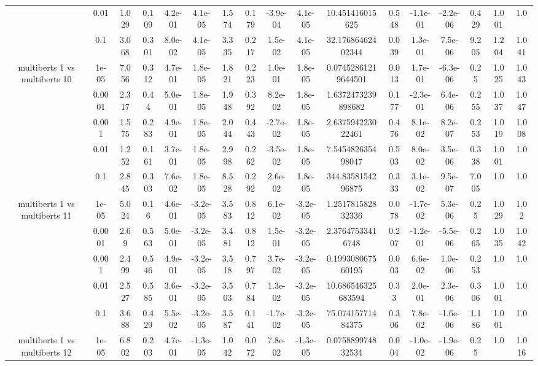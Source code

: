 \begin{tabular}{|c|c|c|c|c|c|c|c|c|c|c|c|c|c|c|c|c|}
 & 0.01 & 1.029 & 0.109 & 4.2e-01 & 4.1e-05 & 1.574 & 0.179 & -3.9e-04 & 4.1e-05 & 10.451416015625 & 0.548 & -1.1e-01 & -2.2e-06 & 0.429 & 1.001 & 1.0 \\
 & 0.1 & 3.068 & 0.301 & 8.0e-02 & 4.1e-05 & 3.335 & 0.217 & 1.5e-02 & 4.1e-05 & 32.17686462402344 & 0.039 & 1.3e-01 & 7.5e-06 & 9.205 & 1.204 & 1.041 \\
\hline
\multirow{5}{*}{multiberts 1 vs multiberts 10} & 1e-05 & 7.056 & 0.312 & 4.7e-01 & 1.8e-05 & 1.821 & 0.223 & 1.0e-01 & 1.8e-05 & 0.07452861219644501 & 0.013 & 1.7e-01 & -6.3e-06 & 0.25 & 1.025 & 1.043 \\
 & 0.0001 & 2.317 & 0.44 & 5.0e-01 & 1.8e-05 & 1.948 & 0.392 & 8.2e-02 & 1.8e-05 & 1.6372473239898682 & 0.177 & -2.3e-01 & 6.4e-06 & 0.255 & 1.037 & 1.047 \\
 & 0.001 & 1.575 & 0.283 & 4.9e-01 & 1.8e-05 & 2.044 & 0.443 & -2.7e-02 & 1.8e-05 & 2.637594223022461 & 0.476 & 8.1e-02 & 8.2e-07 & 0.253 & 1.019 & 1.008 \\
 & 0.01 & 1.252 & 0.161 & 3.7e-01 & 1.8e-05 & 2.998 & 0.262 & -3.5e-02 & 1.8e-05 & 7.545482635498047 & 0.503 & 8.0e-02 & 3.5e-06 & 0.338 & 1.001 & 1.0 \\
 & 0.1 & 2.845 & 0.303 & 7.6e-02 & 1.8e-05 & 8.528 & 0.292 & 2.6e-02 & 1.8e-05 & 344.8358154296875 & 0.333 & 3.1e-02 & 9.5e-07 & 7.005 & 1.0 & 1.0 \\
\hline
\multirow{5}{*}{multiberts 1 vs multiberts 11} & 1e-05 & 5.024 & 0.16 & 4.6e-01 & -3.2e-05 & 3.583 & 0.812 & 6.1e-02 & -3.2e-05 & 1.251781582832336 & 0.078 & -1.7e-02 & 5.3e-06 & 0.25 & 1.029 & 1.02 \\
 & 0.0001 & 2.69 & 0.563 & 5.0e-01 & -3.2e-05 & 3.481 & 0.812 & 1.5e-01 & -3.2e-05 & 2.37647533416748 & 0.207 & -1.2e-01 & -5.5e-06 & 0.265 & 1.035 & 1.042 \\
 & 0.001 & 2.499 & 0.546 & 4.9e-01 & -3.2e-05 & 3.518 & 0.797 & 3.7e-02 & -3.2e-05 & 0.199308067560195 & 0.003 & 6.6e-02 & 1.0e-06 & 0.253 & 1.0 & 1.0 \\
 & 0.01 & 2.527 & 0.585 & 3.6e-01 & -3.2e-05 & 3.503 & 0.784 & 1.3e-02 & -3.2e-05 & 10.686546325683594 & 0.33 & 2.0e-01 & 2.3e-06 & 0.306 & 1.001 & 1.0 \\
 & 0.1 & 3.688 & 0.429 & 5.5e-02 & -3.2e-05 & 3.587 & 0.141 & -1.7e-02 & -3.2e-05 & 75.07415771484375 & 0.306 & 7.8e-02 & -1.6e-06 & 1.186 & 1.001 & 1.0 \\
\hline
\multirow{5}{*}{multiberts 1 vs multiberts 12} & 1e-05 & 6.802 & 0.203 & 4.7e-01 & -1.3e-05 & 1.042 & 0.072 & 7.8e-02 & -1.3e-05 & 0.075889974832534 & 0.004 & -1.0e-02 & -1.9e-06 & 0.25 & 1.0 & 1.016 \\

\end{tabular}
